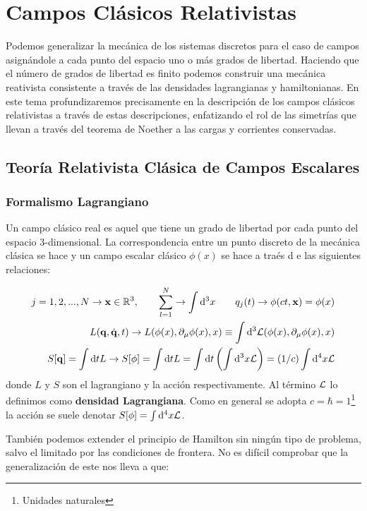 \chapter{Campos Clásicos Relativistas}

Podemos generalizar la mecánica de los sistemas discretos para el caso de campos asignándole a cada punto del espacio uno o más grados de libertad. Haciendo que el número de grados de libertad es finito podemos construir una mecánica reativista consistente a través de las densidades lagrangianas y hamiltonianas. En este tema profundizaremos precisamente en la descripción de los campos clásicos relativistas a través de estas descripciones, enfatizando el rol de las simetrías que llevan a través del teorema de Noether a las cargas y corrientes conservadas. 

\section{Teoría Relativista Clásica de Campos Escalares}
\subsection{Formalismo Lagrangiano}

Un campo clásico real es aquel que tiene un grado de libertad por cada punto del espacio 3-dimensional. La correspondencia entre un punto discreto de la mecánica clásica se hace y un campo escalar clásico $\phi(x)$ se hace a traés d e las siguientes relaciones:

\begin{equation}
	\begin{split}
		j=1,2,...,N \rightarrow \mathbf{x} \in \mathbb{R}^3, \qquad \sum_{l=1}^{N} \rightarrow \int \mathrm{d}^3 x  \qquad q_j (t) \rightarrow \phi(ct,\mathbf{x}) = \phi(x) \\
		L(\mathbf{q},\dot{\mathbf{q}},t) \rightarrow L(\phi(x),\partial_\mu \phi(x),x) \equiv \int \mathrm{d}^3 \mathcal{L} (\phi(x),\partial_\mu \phi(x),x) \\
		S[\mathbf{q}] = \int \mathrm{d} t L \rightarrow S[\phi] = \int \mathrm{d} t L = \int \mathrm{d} t \left( \int \mathrm{d}^3 x \mathcal{L} \right) = (1/c) \int \mathrm{d}^4 x \mathcal{L}
	\end{split}
\end{equation}
donde $L$ y $S$ son el lagrangiano y la acción respectivamente. Al término $\mathcal{L}$ lo definimos como \textbf{densidad Lagrangiana}. Como en general se adopta $c=\hbar=1$\footnote{Unidades naturales} la acción se suele denotar $S[\phi] = \int \mathrm{d}^4 x \mathcal{L}$. 

También podemos extender el principio de Hamilton sin ningún tipo de problema, salvo el limitado por las condiciones de frontera. No es difícil comprobar que la generalización de este nos lleva a que:

